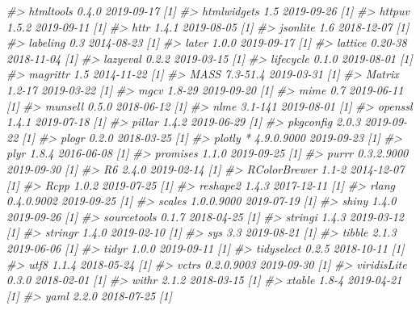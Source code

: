 \documentclass[
  12pt,
]{krantz}
\newenvironment{Shaded}{\begin{snugshade}}{\end{snugshade}}
\newcommand{\CommentTok}[1]{\textcolor[rgb]{0.56,0.35,0.01}{\textit{#1}}}
\begin{document}
\begin{Shaded}
\begin{Highlighting}[]
\CommentTok{#>  htmltools      0.4.0      2019-09-17 [1]}
\CommentTok{#>  htmlwidgets    1.5        2019-09-26 [1]}
\CommentTok{#>  httpuv         1.5.2      2019-09-11 [1]}
\CommentTok{#>  httr           1.4.1      2019-08-05 [1]}
\CommentTok{#>  jsonlite       1.6        2018-12-07 [1]}
\CommentTok{#>  labeling       0.3        2014-08-23 [1]}
\CommentTok{#>  later          1.0.0      2019-09-17 [1]}
\CommentTok{#>  lattice        0.20-38    2018-11-04 [1]}
\CommentTok{#>  lazyeval       0.2.2      2019-03-15 [1]}
\CommentTok{#>  lifecycle      0.1.0      2019-08-01 [1]}
\CommentTok{#>  magrittr       1.5        2014-11-22 [1]}
\CommentTok{#>  MASS           7.3-51.4   2019-03-31 [1]}
\CommentTok{#>  Matrix         1.2-17     2019-03-22 [1]}
\CommentTok{#>  mgcv           1.8-29     2019-09-20 [1]}
\CommentTok{#>  mime           0.7        2019-06-11 [1]}
\CommentTok{#>  munsell        0.5.0      2018-06-12 [1]}
\CommentTok{#>  nlme           3.1-141    2019-08-01 [1]}
\CommentTok{#>  openssl        1.4.1      2019-07-18 [1]}
\CommentTok{#>  pillar         1.4.2      2019-06-29 [1]}
\CommentTok{#>  pkgconfig      2.0.3      2019-09-22 [1]}
\CommentTok{#>  plogr          0.2.0      2018-03-25 [1]}
\CommentTok{#>  plotly       * 4.9.0.9000 2019-09-23 [1]}
\CommentTok{#>  plyr           1.8.4      2016-06-08 [1]}
\CommentTok{#>  promises       1.1.0      2019-09-25 [1]}
\CommentTok{#>  purrr          0.3.2.9000 2019-09-30 [1]}
\CommentTok{#>  R6             2.4.0      2019-02-14 [1]}
\CommentTok{#>  RColorBrewer   1.1-2      2014-12-07 [1]}
\CommentTok{#>  Rcpp           1.0.2      2019-07-25 [1]}
\CommentTok{#>  reshape2       1.4.3      2017-12-11 [1]}
\CommentTok{#>  rlang          0.4.0.9002 2019-09-25 [1]}
\CommentTok{#>  scales         1.0.0.9000 2019-07-19 [1]}
\CommentTok{#>  shiny          1.4.0      2019-09-26 [1]}
\CommentTok{#>  sourcetools    0.1.7      2018-04-25 [1]}
\CommentTok{#>  stringi        1.4.3      2019-03-12 [1]}
\CommentTok{#>  stringr        1.4.0      2019-02-10 [1]}
\CommentTok{#>  sys            3.3        2019-08-21 [1]}
\CommentTok{#>  tibble         2.1.3      2019-06-06 [1]}
\CommentTok{#>  tidyr          1.0.0      2019-09-11 [1]}
\CommentTok{#>  tidyselect     0.2.5      2018-10-11 [1]}
\CommentTok{#>  utf8           1.1.4      2018-05-24 [1]}
\CommentTok{#>  vctrs          0.2.0.9003 2019-09-30 [1]}
\CommentTok{#>  viridisLite    0.3.0      2018-02-01 [1]}
\CommentTok{#>  withr          2.1.2      2018-03-15 [1]}
\CommentTok{#>  xtable         1.8-4      2019-04-21 [1]}
\CommentTok{#>  yaml           2.2.0      2018-07-25 [1]}

\end{Highlighting}
\end{Shaded}
\end{document}
